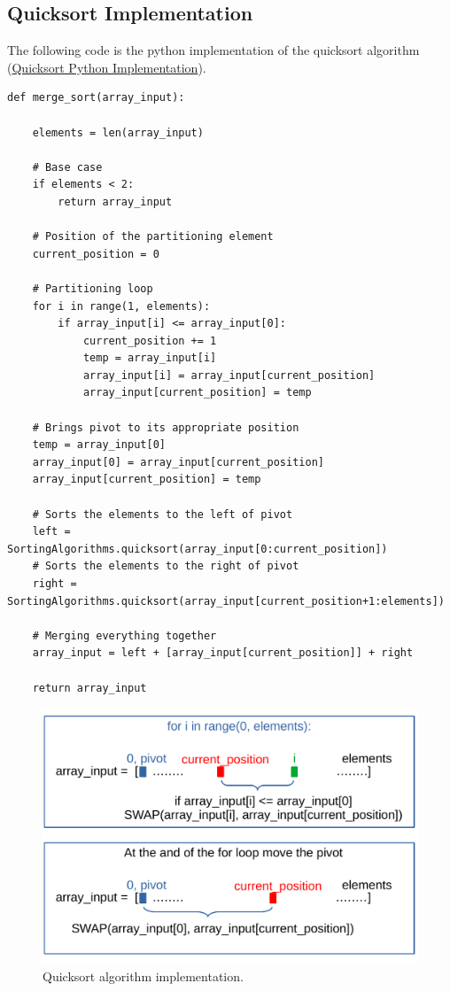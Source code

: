\subsection{Quicksort Implementation}
The following code is the python implementation of the quicksort algorithm \cite{quicksortcode} (\href{https://www.educative.io/edpresso/how-to-implement-quicksort-in-python}{Quicksort Python Implementation}).
\begin{lstlisting}[firstnumber=1, caption={Quicksort python implementation.}]
def merge_sort(array_input):
	
	elements = len(array_input)
        
    # Base case
    if elements < 2:
    	return array_input
        
    # Position of the partitioning element
    current_position = 0

	# Partitioning loop
	for i in range(1, elements):
    	if array_input[i] <= array_input[0]:
        	current_position += 1
            temp = array_input[i]
            array_input[i] = array_input[current_position]
            array_input[current_position] = temp

    # Brings pivot to its appropriate position
    temp = array_input[0]
    array_input[0] = array_input[current_position]
    array_input[current_position] = temp
        
    # Sorts the elements to the left of pivot
    left = SortingAlgorithms.quicksort(array_input[0:current_position])
    # Sorts the elements to the right of pivot
    right = SortingAlgorithms.quicksort(array_input[current_position+1:elements])

    # Merging everything together
    array_input = left + [array_input[current_position]] + right

	return array_input
\end{lstlisting}

\begin{figure}[H]
	\begin{center}
		\includegraphics[scale=.6]{chapters/searchandsorting/images/sorting_12.pdf}
		\caption[Quicksort algorithm implementation.]{Quicksort algorithm implementation.}
		\label{sorting_12}
	\end{center}
\end{figure}